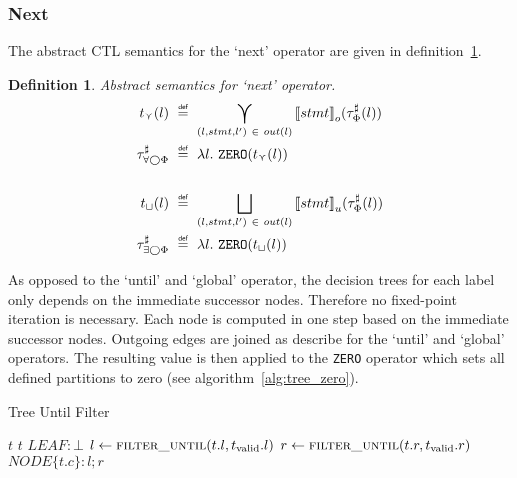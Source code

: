 \documentclass[11pt,a4paper,titlepage]{article}
\newtheorem{definition}{Definition}[section]
\newcommand\eqdef{\mathrel{\overset{\makebox[0pt]{\mbox{\normalfont\tiny\sffamily def}}}{=}}}
\begin{document}
\subsubsection*{Next}
The abstract CTL semantics for the `next' operator are given in definition~\ref{def:abstract_next_semantics}. 

\begin{definition}\label{def:abstract_next_semantics}
    Abstract semantics for `next' operator.
    \setlength{\jot}{15pt}
    \begin{align*}
        t_{\curlyvee}(l) \ &\eqdef \  
        \bigcurlyvee\limits_{(l, stmt, l') \ \in \ out(l) } {\llbracket stmt \rrbracket}_{o}(\tau^\sharp_\Phi(l)) \\
        \tau^\sharp_{\forall\bigcirc\Phi} \ &\eqdef \ \lambda l. \ \mathtt{ZERO}(t_{\curlyvee}(l))\\\\
        t_{\sqcup}(l) \ &\eqdef \  
        \bigsqcup\limits_{(l, stmt, l') \ \in \ out(l) } {\llbracket stmt \rrbracket}_{u}(\tau^\sharp_\Phi(l)) \\
        \tau^\sharp_{\exists\bigcirc\Phi} \ &\eqdef \ \lambda l. \ \mathtt{ZERO}(t_{\sqcup}(l))\\
    \end{align*}
\end{definition}

As opposed to the `until' and `global' operator, the decision trees for each label only depends on the immediate successor nodes.
Therefore no fixed-point iteration is necessary. Each node is computed in one step based on the immediate successor nodes.
Outgoing edges are joined as describe for the `until' and `global' operators. The resulting value is then applied to the \texttt{ZERO}
operator which sets all defined partitions to zero (see algorithm~\ref{alg:tree_zero}).




\begin{algorithm}                      
    \caption{Tree Until Filter}         
    \label{alg:tree_until_filter}       
    \begin{algorithmic}
                \LineComment{ignore $NIL$ nodes}
                \State \Return $t$
                \State \Return $t$
                \State \Return $LEAF: \bot$
            \Else
                \State $l \gets \Call{filter\_until}{t.l, t_{\text{valid}}.l}$
                \State $r \gets \Call{filter\_until}{t.r, t_{\text{valid}}.r}$
                \State \Return $NODE\{t.c \}: l ; r$
            \EndIf 
        \EndFunction
\end{algorithmic}
\end{algorithm}
\end{document}
